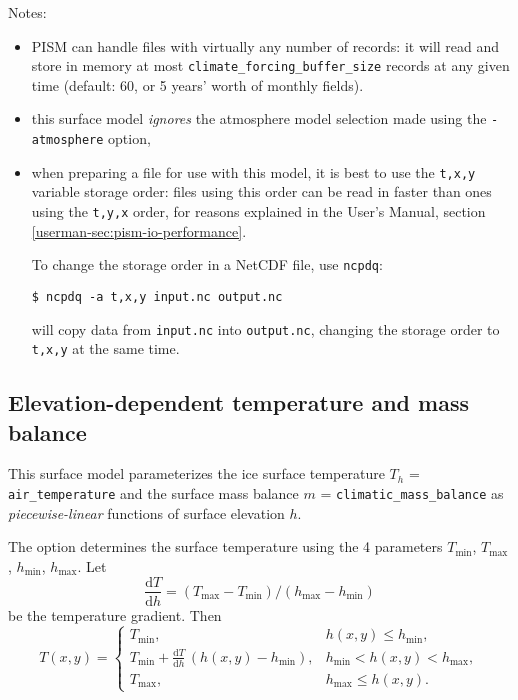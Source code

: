 \documentclass[titlepage,letterpaper,final]{scrartcl}
\begin{document}
\noindent Notes:
\begin{itemize}
\item PISM can handle files with virtually any number of records: it will
  read and store in memory at most \texttt{climate_forcing_buffer_size} records
  at any given time (default: 60, or 5 years' worth of monthly fields).
\item this surface model \emph{ignores} the atmosphere model selection made
  using the \texttt{-atmosphere} option,
\item when preparing a file for use with this model, it is best to use the \texttt{t,x,y} variable storage order: files using this order can be read in faster than ones using the \texttt{t,y,x} order, for reasons explained in the User's Manual, section \ref*{userman-sec:pism-io-performance}.

  To change the storage order in a NetCDF file, use \texttt{ncpdq}:
\begin{verbatim}
$ ncpdq -a t,x,y input.nc output.nc
\end{verbatim}%
  will copy data from \texttt{input.nc} into \texttt{output.nc}, changing the storage order to \texttt{t,x,y} at the same time.
\end{itemize}

\subsection{Elevation-dependent temperature and mass balance}
\label{sec:surface-elev-depend-temp}

\newcommand{\var}[2]{ {#1}_{\text{#2}} }
\newcommand{\h}[1]{ \var{h}{#1} }
\newcommand{\T}[1]{ \var{T}{#1} }
\newcommand{\m}[1]{ \var{m}{#1} }
\newcommand{\ms}[1]{ \var{m^{*}}{#1} }
\newcommand{\diff}[2]{ \frac{\mathrm{d}#1}{\mathrm{d}#2} }

This surface model parameterizes the ice surface temperature $T_{h}$ = \texttt{air_temperature} and the surface mass balance $m$ = \texttt{climatic_mass_balance} as \emph{piecewise-linear} functions of surface elevation $h$.

The option  determines the surface temperature using the 4 parameters $\T{min}$, $\T{max}$, $\h{min}$, $\h{max}$. Let
\begin{equation}
  \diff{T}{h} = (\T{max} - \T{min}) / (\h{max} - \h{min})
\end{equation}
be the temperature gradient. Then
\begin{equation}
  T(x,y) =
  \begin{cases}
    \T{min}, & h(x,y) \le \h{min}, \\
    \T{min} + \diff{T}{h} \, (h(x,y) - \h{min}), & \h{min} < h(x,y) < \h{max}, \\
    \T{max}, & \h{max} \le h(x,y).
  \end{cases}
\end{equation}
\end{document}
